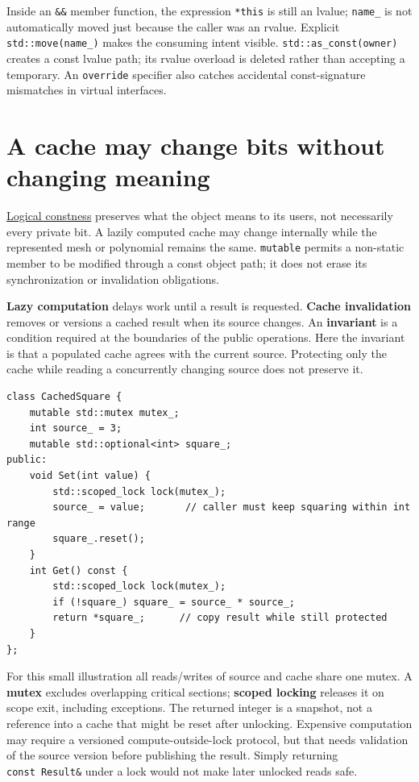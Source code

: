 Inside an \texttt{\&\&} member function, the expression \texttt{*this} is still an lvalue; \texttt{name\_} is not automatically moved just because the caller was an rvalue. Explicit \texttt{std::move(name\_)} makes the consuming intent visible. \texttt{std::as\_const(owner)} creates a const lvalue path; its rvalue overload is deleted rather than accepting a temporary. An \texttt{override} specifier also catches accidental const-signature mismatches in virtual interfaces.

\section{A cache may change bits without changing meaning}\label{01-foundations-i-ch003-a-cache-may-change-bits-without-changing-meaning}

\hyperref[appendix-f5593256bcaf]{Logical constness} preserves what the object means to its users, not necessarily every private bit. A lazily computed cache may change internally while the represented mesh or polynomial remains the same. \texttt{mutable} permits a non-static member to be modified through a const object path; it does not erase its synchronization or invalidation obligations.

\textbf{Lazy computation} delays work until a result is requested. \textbf{Cache invalidation} removes or versions a cached result when its source changes. An \textbf{invariant} is a condition required at the boundaries of the public operations. Here the invariant is that a populated cache agrees with the current source. Protecting only the cache while reading a concurrently changing source does not preserve it.

\begin{verbatim}
class CachedSquare {
    mutable std::mutex mutex_;
    int source_ = 3;
    mutable std::optional<int> square_;
public:
    void Set(int value) {
        std::scoped_lock lock(mutex_);
        source_ = value;       // caller must keep squaring within int range
        square_.reset();
    }
    int Get() const {
        std::scoped_lock lock(mutex_);
        if (!square_) square_ = source_ * source_;
        return *square_;      // copy result while still protected
    }
};
\end{verbatim}

For this small illustration all reads/writes of source and cache share one mutex. A \textbf{mutex} excludes overlapping critical sections; \textbf{scoped locking} releases it on scope exit, including exceptions. The returned integer is a snapshot, not a reference into a cache that might be reset after unlocking. Expensive computation may require a versioned compute-outside-lock protocol, but that needs validation of the source version before publishing the result. Simply returning \texttt{const\ Result\&} under a lock would not make later unlocked reads safe.


